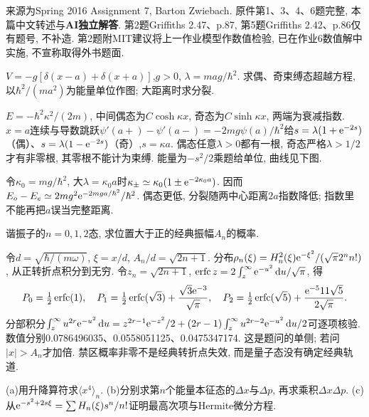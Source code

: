 来源为Spring 2016 Assignment 7, Barton Zwiebach. 原件第1、3、4、6题完整, 本篇中文转述与\textbf{AI独立解答}. 第2题Griffiths 2.47、p.87, 第5题Griffiths 2.42、p.86仅有题号, 不补造. 第2题附MIT建议将上一作业模型作数值检验, 已在作业6数值解中实施, 不宣称取得外书题面.
\begin{exercise}
$V=-g[\delta(x-a)+\delta(x+a)]$,$g>0$, $\lambda=mag/\hbar^2$. 求偶、奇束缚态超越方程, 以$\hbar^2/(ma^2)$为能量单位作图; 大距离时求分裂.
\end{exercise}
\begin{solution}
$E=-\hbar^2\kappa^2/(2m)$, 中间偶态为$C\cosh\kappa x$, 奇态为$C\sinh\kappa x$, 两端为衰减指数. $x=a$连续与导数跳跃$\psi'(a+)-\psi'(a-)=-2mg\psi(a)/\hbar^2$给$s=\lambda(1+\mathrm e^{-2s})$（偶）、$s=\lambda(1-\mathrm e^{-2s})$（奇）,$s=\kappa a$. 偶态任意$\lambda>0$都有一根, 奇态严格$\lambda>1/2$才有非零根, 其零根不能计为束缚. 能量为$-s^2/2$乘题给单位, 曲线见下图.

令$\kappa_0=mg/\hbar^2$, 大$\lambda=\kappa_0a$时$\kappa_\pm\simeq\kappa_0(1\pm\mathrm e^{-2\kappa_0a})$. 因而$E_o-E_e\simeq2mg^2\mathrm e^{-2mga/\hbar^2}/\hbar^2$. 偶态更低, 分裂随两中心距离$2a$指数降低; 指数里不能再把$a$误当完整距离.

\end{solution}
\begin{exercise}
谐振子的$n=0,1,2$态, 求位置大于正的经典振幅$A_n$的概率.
\end{exercise}
\begin{solution}
令$d=\sqrt{\hbar/(m\omega)}$, $\xi=x/d$, $A_n/d=\sqrt{2n+1}$. 分布$\rho_n(\xi)=H_n^2(\xi)\mathrm e^{-\xi^2}/(\sqrt\pi 2^n n!)$, 从正转折点积分到无穷. 令$z_n=\sqrt{2n+1}$, $\operatorname{erfc}z=2\int_z^\infty\mathrm e^{-u^2}\,\mathrm d u/\sqrt\pi$, 得
\[
P_0=\tfrac12\operatorname{erfc}(1),\quad
P_1=\tfrac12\operatorname{erfc}(\sqrt3)+\frac{\sqrt3\mathrm e^{-3}}{\sqrt\pi},\quad
P_2=\tfrac12\operatorname{erfc}(\sqrt5)+\frac{\mathrm e^{-5}11\sqrt5}{2\sqrt\pi}.
\]
分部积分$\int_z^\infty u^{2r}\mathrm e^{-u^2}\,\mathrm d u=z^{2r-1}\mathrm e^{-z^2}/2+(2r-1)\int_z^\infty u^{2r-2}\mathrm e^{-u^2}\,\mathrm d u/2$可逐项核验. 数值分别0.0786496035、0.0558051125、0.0475347174. 这是题问的单侧; 若问$|x|>A_n$才加倍. 禁区概率非零不是经典转折点失效, 而是量子态没有确定经典轨道.
\end{solution}
\begin{exercise}
(a)用升降算符求$\langle x^4\rangle_n$. (b)分别求第$n$个能量本征态的$\Delta x$与$\Delta p$, 再求乘积$\Delta x\Delta p$. (c)从$\mathrm e^{-s^2+2s\xi}=\sum H_n(\xi)s^n/n!$证明最高次项与Hermite微分方程.
\end{exercise}
